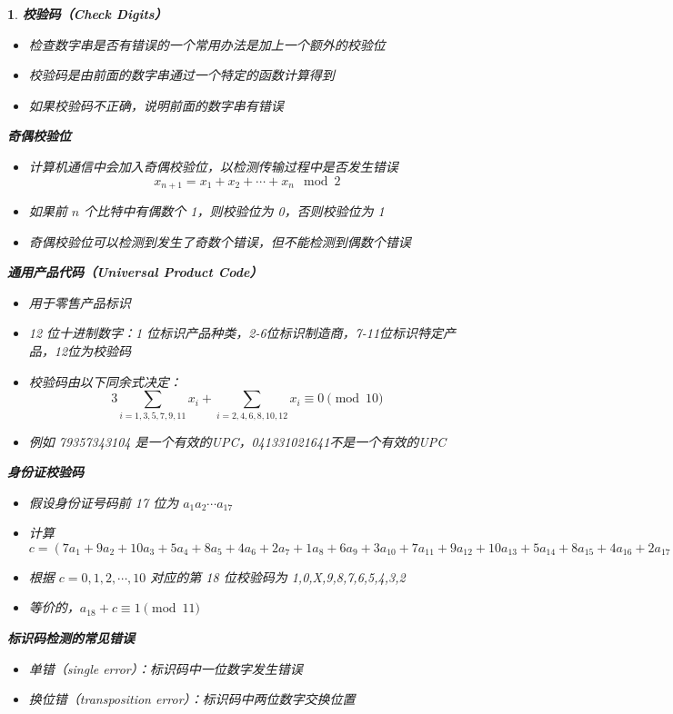 \documentclass[UTF8]{report}
\theoremstyle{MyLineTheoremStyle} %
\theoremstyle{MyBlockTheoremStyle} %
\theoremstyle{MySubsubsectionStyle} %
\newtheorem{definition}{}
\begin{document}
\begin{definition}
    \textbf{校验码（Check Digits）}
    \begin{itemize}
        \item 检查数字串是否有错误的一个常用办法是加上一个额外的校验位
        \item 校验码是由前面的数字串通过一个特定的函数计算得到
        \item 如果校验码不正确，说明前面的数字串有错误
    \end{itemize}

    \textbf{奇偶校验位}
    \begin{itemize}
        \item 计算机通信中会加入奇偶校验位，以检测传输过程中是否发生错误
        \[
        x_{n+1} = x_1 + x_2 + \cdots + x_n \mod 2
        \]
        \item 如果前 $n$ 个比特中有偶数个 1，则校验位为 0，否则校验位为 1
        \item 奇偶校验位可以检测到发生了奇数个错误，但不能检测到偶数个错误
    \end{itemize}

    \textbf{通用产品代码（Universal Product Code）}
    \begin{itemize}
        \item 用于零售产品标识
        \item 12 位十进制数字：1 位标识产品种类，2-6位标识制造商，7-11位标识特定产品，12位为校验码
        \item 校验码由以下同余式决定：
        \[
        3\sum_{i=1,3,5,7,9,11} x_i + \sum_{i=2,4,6,8,10,12} x_i \equiv 0 \pmod{10}
        \]
        \item 例如 79357343104 是一个有效的UPC，041331021641不是一个有效的UPC
    \end{itemize}

    \textbf{身份证校验码}
    \begin{itemize}
        \item 假设身份证号码前 17 位为 $a_1a_2 \cdots a_{17}$
        \item 计算 $c = (7a_1 + 9a_2 + 10a_3 + 5a_4 + 8a_5 + 4a_6 + 2a_7 + 1a_8 + 6a_9 + 3a_{10} + 7a_{11} + 9a_{12} + 10a_{13} + 5a_{14} + 8a_{15} + 4a_{16} + 2a_{17}) \mod 11$
        \item 根据 $c = 0,1,2, \cdots, 10$ 对应的第 18 位校验码为 1,0,X,9,8,7,6,5,4,3,2
        \item 等价的，$a_{18} + c \equiv 1 \pmod{11}$
    \end{itemize}

    \textbf{标识码检测的常见错误}
    \begin{itemize}
        \item 单错（single error）：标识码中一位数字发生错误
        \item 换位错（transposition error）：标识码中两位数字交换位置
    \end{itemize}
\end{definition}
\end{document}
